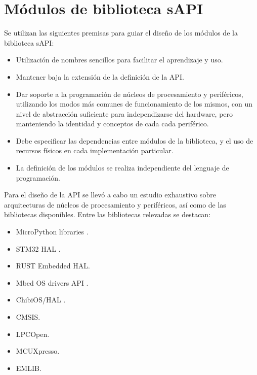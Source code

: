 \section{Módulos de biblioteca sAPI}
\label{sec:modelLibrary}

Se utilizan las siguientes premisas para guiar el diseño de los módulos de la biblioteca sAPI:

\begin{itemize}
\item
Utilización de nombres sencillos para facilitar el aprendizaje y uso.
\item
Mantener baja la extensión de la definición de la API.
\item
Dar soporte a la programación de núcleos de procesamiento y periféricos, utilizando los modos más comunes de funcionamiento de los mismos, con un nivel de abstracción suficiente para independizarse del hardware, pero manteniendo la identidad y conceptos de cada cada periférico.
\item
Debe especificar las dependencias entre módulos de la biblioteca, y el uso de recursos físicos en cada implementación particular.
\item
La definición de los módulos se realiza independiente del lenguaje de programación.
\end{itemize}

Para el diseño de la API se llevó a cabo un estudio exhaustivo sobre arquitecturas de núcleos de procesamiento y periféricos, así como de las bibliotecas disponibles. Entre las bibliotecas relevadas se destacan:

\begin{itemize}
\item
MicroPython libraries \citep{MicroPythonLib}. %
\item
STM32 HAL \citep{STM32hal}. %
\item
RUST Embedded HAL\citep{RUSTEmbeddedHAL}. %
\item
Mbed OS drivers API \citep{MbedOSdrivers}. %
\item
ChibiOS/HAL \citep{ChibiOShal}. %
\item
CMSIS.
\item
LPCOpen.
\item
MCUXpresso.
\item
EMLIB. %
\end{itemize}

